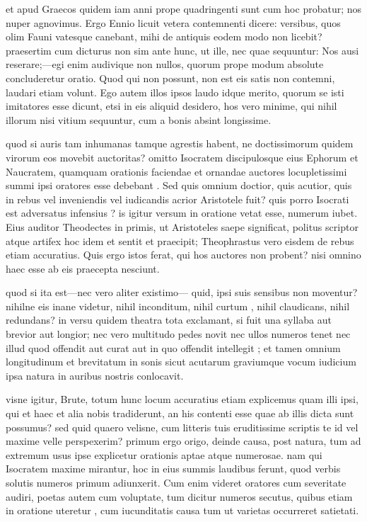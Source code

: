  et apud Graecos quidem iam anni prope quadringenti sunt cum hoc probatur; nos nuper agnovimus. Ergo Ennio licuit vetera contemnenti dicere: versibus, quos olim Fauni vatesque canebant, mihi de antiquis eodem modo non licebit? praesertim cum dicturus non sim ante hunc, ut ille, nec quae sequuntur: Nos ausi reserare;—egi enim audivique non nullos, quorum prope modum absolute concluderetur oratio. Quod qui non possunt, non est eis satis non contemni, laudari etiam volunt. Ego autem illos ipsos laudo idque merito, quorum se isti imitatores esse dicunt, etsi in eis aliquid desidero, hos vero minime, qui nihil illorum nisi vitium sequuntur, cum a bonis absint longissime.

 quod si auris tam inhumanas tamque agrestis habent, ne doctissimorum quidem virorum eos movebit auctoritas? omitto Isocratem discipulosque eius Ephorum et Naucratem, quamquam orationis faciendae et ornandae auctores locupletissimi summi ipsi oratores esse debebant . Sed quis omnium doctior, quis acutior, quis in rebus vel inveniendis vel iudicandis acrior Aristotele fuit? quis porro Isocrati est adversatus infensius ? is igitur versum in oratione vetat esse, numerum iubet. Eius auditor Theodectes in primis, ut Aristoteles saepe significat, politus scriptor atque artifex hoc idem et sentit et praecipit; Theophrastus vero eisdem de rebus etiam accuratius. Quis ergo istos ferat, qui hos auctores non probent? nisi omnino haec esse ab eis praecepta nesciunt.

 quod si ita est—nec vero aliter existimo— quid, ipsi suis sensibus non moventur? nihilne eis inane videtur, nihil inconditum, nihil curtum , nihil claudicans, nihil redundans? in versu quidem theatra tota exclamant, si fuit una syllaba aut brevior aut longior; nec vero multitudo pedes novit nec ullos numeros tenet nec illud quod offendit aut curat aut in quo offendit intellegit ; et tamen omnium longitudinum et brevitatum in sonis sicut acutarum graviumque vocum iudicium ipsa natura in auribus nostris conlocavit.

 visne igitur, Brute, totum hunc locum accuratius etiam explicemus quam illi ipsi, qui et haec et alia nobis tradiderunt, an his contenti esse quae ab illis dicta sunt possumus? sed quid quaero velisne, cum litteris tuis eruditissime scriptis te id vel maxime velle perspexerim? primum ergo origo, deinde causa, post natura, tum ad extremum usus ipse explicetur orationis aptae atque numerosae. nam qui Isocratem maxime mirantur, hoc in eius summis laudibus ferunt, quod verbis solutis numeros primum adiunxerit. Cum enim videret oratores cum severitate audiri, poetas autem cum voluptate, tum dicitur numeros secutus, quibus etiam in oratione uteretur , cum iucunditatis causa tum ut varietas occurreret satietati.

